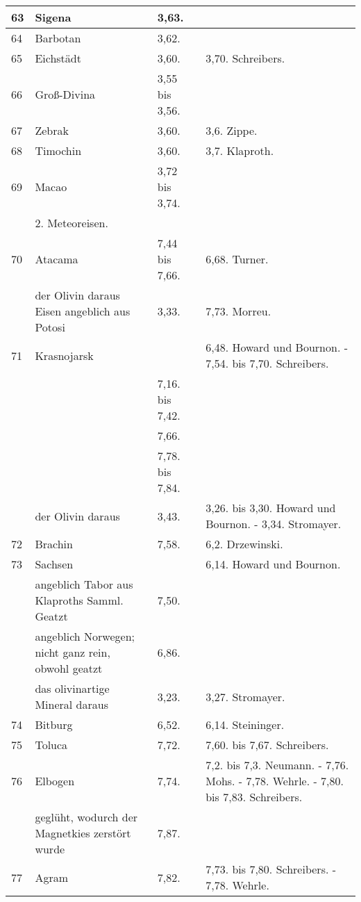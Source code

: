 \documentclass[a4paper, 11pt, oneside, polutonikogreek, german]{article}
\begin{document}
\begin{center}
\begin{longtable}{|p{7mm}|p{32mm}|p{30mm}|p{30mm}|}
        63 & Sigena & 3,63. &   \\ \hline
        64 & Barbotan & 3,62. &   \\ \hline
        65 & Eichstädt & 3,60. & 3,70. Schreibers. \\ \hline
        66 & Groß-Divina & 3,55 bis 3,56. &   \\ \hline
        67 & Zebrak & 3,60. & 3,6. Zippe. \\ \hline
        68 & Timochin & 3,60. & 3,7. Klaproth. \\ \hline
        69 & Macao & 3,72 bis 3,74. &   \\ \hline
          & 2. Meteoreisen. &   &   \\ \hline
        70 & Atacama & 7,44 bis 7,66. & 6,68. Turner. \\ \hline
          & der Olivin daraus Eisen angeblich aus Potosi & 3,33. & 7,73. Morreu. \\ \hline
        71 & Krasnojarsk &   & 6,48. Howard und Bournon. - 7,54. bis 7,70. Schreibers. \\ \hline
         ~ &   & 7,16. bis 7,42. &   \\ \hline
         ~ &   & 7,66. &   \\ \hline
         ~ &   & 7,78. bis 7,84. &   \\ \hline
        ~ & der Olivin daraus & 3,43. & 3,26. bis 3,30. Howard und Bournon. - 3,34. Stromayer. \\ \hline
        72 & Brachin & 7,58. & 6,2. Drzewinski. \\ \hline
        73 & Sachsen &   & 6,14. Howard und Bournon. \\ \hline
         ~ & angeblich Tabor aus Klaproths Samml. Geatzt & 7,50. &   \\ \hline
         ~ & angeblich Norwegen; nicht ganz rein, obwohl geatzt & 6,86. &   \\ \hline
        ~  & das olivinartige Mineral daraus & 3,23. & 3,27. Stromayer. \\ \hline
        74 & Bitburg & 6,52. & 6,14. Steininger. \\ \hline
        75 & Toluca & 7,72. & 7,60. bis 7,67. Schreibers. \\ \hline
        76 & Elbogen & 7,74. & 7,2. bis 7,3. Neumann. - 7,76. Mohs. - 7,78. Wehrle. - 7,80. bis 7,83. Schreibers. \\ \hline
         ~ & geglüht, wodurch der Magnetkies zerstört wurde & 7,87. & ~  \\ \hline
        77 & Agram & 7,82. & 7,73. bis 7,80. Schreibers. - 7,78. Wehrle. \\ \hline

\end{longtable}
\end{center}
\end{document}
